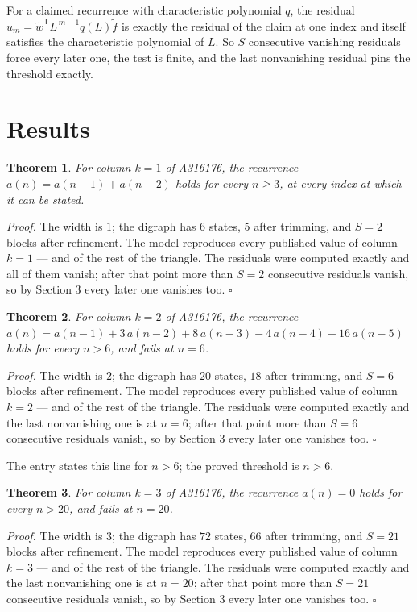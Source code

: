 \documentclass[11pt]{article}
\newtheorem{theorem}{Theorem}
\theoremstyle{definition}
\begin{document}
For a claimed recurrence with characteristic polynomial $q$, the residual $u_m = \tilde w^{\mathsf T}L^{\,m-1}q(L)\tilde f$ is exactly the residual of the claim at one index and itself satisfies the characteristic polynomial of $L$. So $S$ consecutive vanishing residuals force every later one, the test is finite, and the last nonvanishing residual pins the threshold exactly.

\section{Results}

\begin{theorem} For column $k = 1$ of A316176, the recurrence $a(n) = a(n-1) + a(n-2)$ holds for every $n \ge 3$, at every index at which it can be stated.\end{theorem}

{\itshape Proof.} The width is $1$; the digraph has $6$ states, $5$ after trimming, and $S = 2$ blocks after refinement. The model reproduces every published value of column $k = 1$ --- and of the rest of the triangle. The residuals were computed exactly and all of them vanish; after that point more than $S = 2$ consecutive residuals vanish, so by Section 3 every later one vanishes too. $\square$

\begin{theorem} For column $k = 2$ of A316176, the recurrence $a(n) = a(n-1) + 3\,a(n-2) + 8\,a(n-3) - 4\,a(n-4) - 16\,a(n-5)$ holds for every $n > 6$, and fails at $n = 6$.\end{theorem}

{\itshape Proof.} The width is $2$; the digraph has $20$ states, $18$ after trimming, and $S = 6$ blocks after refinement. The model reproduces every published value of column $k = 2$ --- and of the rest of the triangle. The residuals were computed exactly and the last nonvanishing one is at $n = 6$; after that point more than $S = 6$ consecutive residuals vanish, so by Section 3 every later one vanishes too. $\square$

The entry states this line for $n > 6$; the proved threshold is $n > 6$.

\begin{theorem} For column $k = 3$ of A316176, the recurrence $a(n) = 0$ holds for every $n > 20$, and fails at $n = 20$.\end{theorem}

{\itshape Proof.} The width is $3$; the digraph has $72$ states, $66$ after trimming, and $S = 21$ blocks after refinement. The model reproduces every published value of column $k = 3$ --- and of the rest of the triangle. The residuals were computed exactly and the last nonvanishing one is at $n = 20$; after that point more than $S = 21$ consecutive residuals vanish, so by Section 3 every later one vanishes too. $\square$
\end{document}
